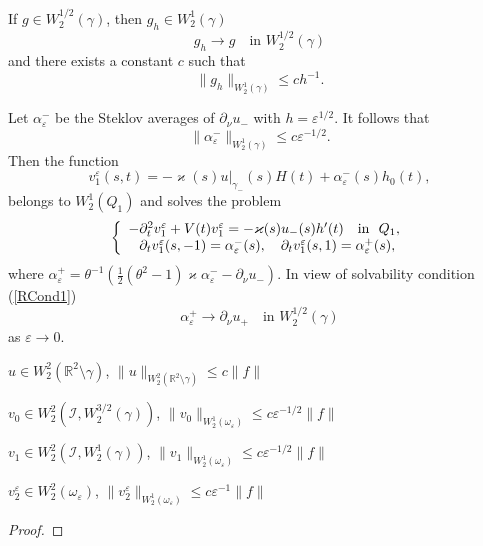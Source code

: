 \documentclass[graybox]{svmult}
\renewcommand{\kappa}{\varkappa}
\newcommand{\Real}{\mathbb R}
\newcommand{\eps}{\varepsilon}
\newcommand{\cI}{\mathcal{I}}
\renewcommand{\leq}{\leqslant}
\newcommand{\eqref}[1]{(\ref{#1})}
\newcommand{\pte}{\partial_t}
\begin{document}
If $g\in W_2^{1/2}(\gamma)$, then $g_h\in W_2^1(\gamma)$
$$
   g_h\to g \quad \mbox{in } W_2^{1/2}(\gamma)
$$
and there exists a constant $c$ such that
$$
     \|g_h\|_{W_2^1(\gamma)}\leq c h^{-1}.
$$

Let $\alpha_\eps^-$ be the Steklov averages of $\partial_\nu u_-$ with $h=\eps^{1/2}$. It follows that
$$
         \|\alpha_\eps^-\|_{W_2^1(\gamma)}\leq c \eps^{-1/2}.
$$
Then the function
$$
   v_1^\eps(s,t)=-\kappa(s) u|_{\gamma_-}(s)H(t)+\alpha_\eps^-(s)h_0(t),
$$
belongs to $W_2^1(Q_1)$ and solves the problem
\begin{equation}\label{ProblemV1eps}
\left\{
  \begin{array}{ll}
    -\pte^2 v_1^\eps+V(t)v_1^\eps=-\kappa(s)u_-(s)h'(t)\quad \hbox{in \ } Q_1, \\
    \phantom{-}\partial_t v_1^\eps(s, -1)=\alpha_\eps^-(s), \quad
\partial_t v_1^\eps(s, 1)=\alpha_\eps^+(s),
  \end{array}
\right.
\end{equation}
where $ \alpha_\eps^+=\theta^{-1} \left(\textstyle\frac{1}{2 }(\theta^2-1)\kappa \alpha_\eps^--\partial_\nu u_-\right)$. In view of solvability condition \eqref{RCond1}
$$
   \alpha_\eps^+\to \partial_\nu u_+ \quad \mbox{in } W_2^{1/2}(\gamma)
$$
 as $\eps\to 0$.



















\begin{proposition}\label{UV0V1}
  $u\in W_2^{2}(\Real^2\setminus \gamma)$, $\|u\|_{W_2^{2}(\Real^2\setminus \gamma)}\leq c\|f\|$

$v_0\in W_2^2(\cI,W_2^{3/2}(\gamma))$, $\|v_0\|_{W_2^{1}(\omega_\eps)}\leq c \eps^{-1/2}\|f\|$

$v_1\in W_2^2(\cI,W_2^{1}(\gamma))$, $\|v_1\|_{W_2^{1}(\omega_\eps)}\leq c \eps^{-1/2}\|f\|$

$v_2^\eps\in W_2^2(\omega_\eps)$, $\|v_2^\eps\|_{W_2^{1}(\omega_\eps)}\leq c \eps^{-1}\|f\|$
\end{proposition}




\begin{proof}




\end{proof}
\end{document}
